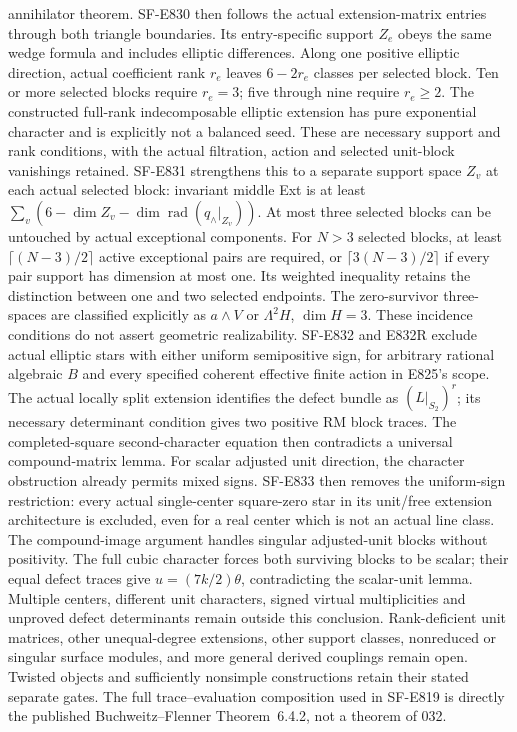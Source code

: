 \documentclass[11pt]{article}
\theoremstyle{remark}\newtheorem{remark}[theorem]{Remark}
\begin{document}
annihilator theorem.
SF-E830 then follows the actual extension-matrix entries through both
triangle boundaries. Its entry-specific support $Z_e$ obeys the same
wedge formula and includes elliptic differences. Along one positive
elliptic direction, actual coefficient rank $r_e$ leaves $6-2r_e$
classes per selected block. Ten or more selected blocks require
$r_e=3$; five through nine require $r_e\ge2$. The constructed
full-rank indecomposable elliptic extension has pure exponential
character and is explicitly not a balanced seed. These are necessary
support and rank conditions, with the actual filtration, action and
selected unit-block vanishings retained.
SF-E831 strengthens this to a separate support space $Z_v$ at each
actual selected block: invariant middle Ext is at least
$\sum_v(6-\dim Z_v-\dim\operatorname{rad}(q_\wedge|_{Z_v}))$.
At most three selected blocks can be untouched by actual exceptional
components. For $N>3$ selected blocks, at least
$\lceil(N-3)/2\rceil$ active exceptional pairs are required, or
$\lceil3(N-3)/2\rceil$ if every pair support has dimension at most one.
Its weighted inequality retains the distinction between one and two
selected endpoints. The zero-survivor three-spaces are classified
explicitly as $a\wedge V$ or $\Lambda^2H$, $\dim H=3$.
These incidence conditions do not assert geometric realizability.
SF-E832 and E832R exclude actual elliptic stars with either uniform
semipositive sign, for arbitrary rational algebraic $B$ and every
specified coherent effective finite action in E825's scope.
The actual locally split extension identifies the defect bundle as
$(L|_{S_2})^r$; its necessary determinant condition gives two positive
RM block traces. The completed-square second-character equation then
contradicts a universal compound-matrix lemma. For scalar adjusted
unit direction, the character obstruction already permits mixed signs.
SF-E833 then removes the uniform-sign restriction: every actual
single-center square-zero star in its unit/free extension architecture
is excluded, even for a real center which is not an actual line class.
The compound-image argument handles singular adjusted-unit blocks
without positivity. The full cubic character forces both surviving
blocks to be scalar; their equal defect traces give
$u=(7k/2)\theta$, contradicting the scalar-unit lemma.
Multiple centers, different unit characters, signed virtual
multiplicities and unproved defect determinants remain outside
this conclusion.
Rank-deficient unit matrices, other unequal-degree extensions, other
support classes, nonreduced or singular surface modules, and more general
derived couplings remain open. Twisted objects and
sufficiently nonsimple constructions retain their stated separate gates.
The full trace--evaluation composition used in SF-E819 is directly the
published Buchweitz--Flenner Theorem~6.4.2, not a theorem of 032.
\end{document}
